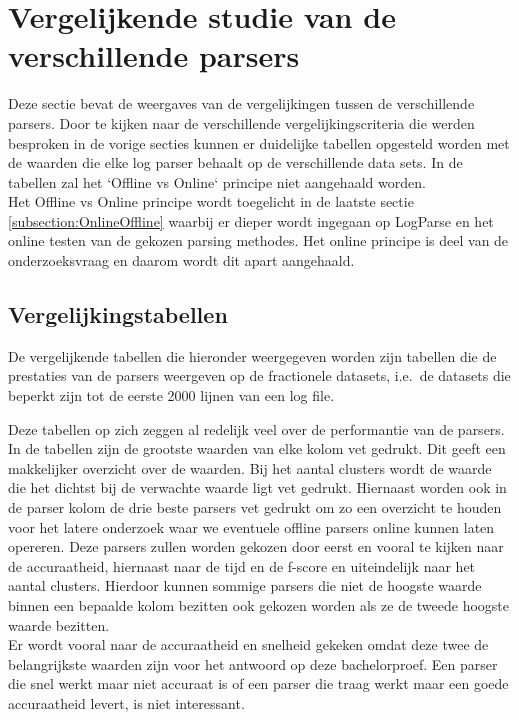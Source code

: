 \section{Vergelijkende studie van de verschillende parsers}
Deze sectie bevat de weergaves van de vergelijkingen tussen de verschillende parsers. Door te kijken naar de verschillende vergelijkingscriteria die werden besproken in de vorige secties kunnen er duidelijke tabellen opgesteld worden met de waarden die elke log parser behaalt op de verschillende data sets. In de tabellen zal het `Offline vs Online` principe niet aangehaald worden.\\

Het Offline vs Online principe wordt toegelicht in de laatste sectie \ref{subsection:OnlineOffline} waarbij er dieper wordt ingegaan op LogParse en het online testen van de gekozen parsing methodes. Het online principe is deel van de onderzoeksvraag en daarom wordt dit apart aangehaald.\\

\subsection{Vergelijkingstabellen}
De vergelijkende tabellen die hieronder weergegeven worden zijn tabellen die de prestaties van de parsers weergeven op de fractionele datasets, i.e.\ de datasets die beperkt zijn tot de eerste 2000 lijnen van een log file.

Deze tabellen op zich zeggen al redelijk veel over de performantie van de parsers. In de tabellen zijn de grootste waarden van elke kolom vet gedrukt. Dit geeft een makkelijker overzicht over de waarden. Bij het aantal clusters wordt de waarde die het dichtst bij de verwachte waarde ligt vet gedrukt. Hiernaast worden ook in de parser kolom de drie beste parsers vet gedrukt om zo een overzicht te houden voor het latere onderzoek waar we eventuele offline parsers online kunnen laten opereren. Deze parsers zullen worden gekozen door eerst en vooral te kijken naar de accuraatheid, hiernaast naar de tijd en de f-score en uiteindelijk naar het aantal clusters. Hierdoor kunnen sommige parsers die niet de hoogste waarde binnen een bepaalde kolom bezitten ook gekozen worden als ze de tweede hoogste waarde bezitten.\\

Er wordt vooral naar de accuraatheid en snelheid gekeken omdat deze twee de belangrijkste waarden zijn voor het antwoord op deze bachelorproef. Een parser die snel werkt maar niet accuraat is of een parser die traag werkt maar een goede accuraatheid levert, is niet interessant.

